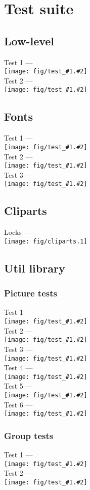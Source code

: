 %

\newcommand{\metaumltest}[2]{Test #2 --- \\ \texttt{[image: fig/test\_\#1.\#2]} \\ }

\section{Test suite}

\subsection{Low-level}
  \metaumltest{lowlevel}{1}
  \metaumltest{lowlevel}{2}

\subsection{Fonts}
  \metaumltest{font}{1}
  \metaumltest{font}{2}
  \metaumltest{font}{3}

\subsection{Cliparts}
  Locks ---\\
  \texttt{[image: fig/cliparts.1]}

\subsection{Util library}
  \subsubsection{Picture tests}
    \metaumltest{picture}{1}
    \metaumltest{picture}{2}
    \metaumltest{picture}{3}
    \metaumltest{picture}{4}
    \metaumltest{picture}{5}
    \metaumltest{picture}{6}

  \subsubsection{Group tests}
    \metaumltest{group}{1}
    \metaumltest{group}{2}

